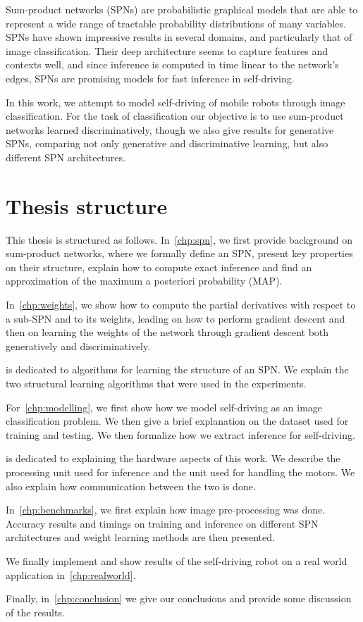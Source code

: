 Sum-product networks (SPNs) are probabilistic graphical models that are able to represent a wide
range of tractable probability distributions of many variables. SPNs have shown impressive results
in several domains, and particularly that of image classification. Their deep architecture seems to
capture features and contexts well, and since inference is computed in time linear to the network's
edges, SPNs are promising models for fast inference in self-driving.

In this work, we attempt to model self-driving of mobile robots through image classification. For
the task of classification our objective is to use sum-product networks learned discriminatively,
though we also give results for generative SPNs, comparing not only generative and discriminative
learning, but also different SPN architectures.

\section{Thesis structure}

This thesis is structured as follows. In~\autoref{chp:spn}, we first provide background on
sum-product networks, where we formally define an SPN, present key properties on their structure,
explain how to compute exact inference and find an approximation of the maximum a posteriori
probability (MAP).

In~\autoref{chp:weights}, we show how to compute the partial derivatives with respect to a sub-SPN
and to its weights, leading on how to perform gradient descent and then on learning the weights of
the network through gradient descent both generatively and discriminatively.

 is dedicated to algorithms for learning the structure of an SPN\@. We explain
the two structural learning algorithms that were used in the experiments.

For~\autoref{chp:modelling}, we first show how we model self-driving as an image classification
problem. We then give a brief explanation on the dataset used for training and testing. We then
formalize how we extract inference for self-driving.

 is dedicated to explaining the hardware aspects of this work. We describe the
processing unit used for inference and the unit used for handling the motors. We also explain how
communication between the two is done.

In~\autoref{chp:benchmarks}, we first explain how image pre-processing was done. Accuracy results
and timings on training and inference on different SPN architectures and weight learning methods
are then presented.

We finally implement and show results of the self-driving robot on a real world application
in~\autoref{chp:realworld}.

Finally, in~\autoref{chp:conclusion} we give our conclusions and provide some discussion of the
results.

